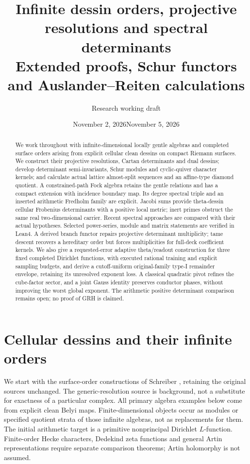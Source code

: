 \documentclass[11pt]{article}
\date{November 2, 2026}
\date{November 5, 2026}
\title{Infinite dessin orders, projective resolutions and spectral determinants\\\large Extended proofs, Schur functors and Auslander--Reiten calculations}
\author{Research working draft}
\theoremstyle{definition}\newtheorem{definition}[theorem]{Definition}
\theoremstyle{remark}\newtheorem{remark}[theorem]{Remark}
\begin{document}
\maketitle
\begin{abstract}
We work throughout with infinite-dimensional locally gentle algebras and completed surface orders arising from explicit cellular clean dessins on compact Riemann surfaces. We construct their projective resolutions, Cartan determinants and dual dessins; develop determinant semi-invariants, Schur modules and cyclic-quiver character kernels; and calculate actual lattice almost-split sequences and an affine-type diamond quotient. A constrained-path Fock algebra retains the gentle relations and has a compact extension with incidence boundary map. Its degree spectral triple and an inserted arithmetic Fredholm family are explicit. Jacobi sums provide theta-dessin cellular Frobenius determinants with a positive local metric; inert primes obstruct the same real two-dimensional carrier. Recent spectral approaches are compared with their actual hypotheses. Selected power-series, module and matrix statements are verified in Lean4. A derived branch functor repairs projective determinant multiplicity; tame descent recovers a hereditary order but forces multiplicities for full-deck coefficient kernels. We also give a requested-error adaptive theta/readout construction for three fixed completed Dirichlet functions, with executed rational training and explicit sampling budgets, and derive a cutoff-uniform original-family type-I remainder envelope, retaining its unresolved exponent loss. A classical quadratic pivot refines the cube-factor sector, and a joint Gauss identity preserves conductor phases, without improving the worst global exponent. The arithmetic positive determinant comparison remains open; no proof of GRH is claimed.
\end{abstract}
{\small\tableofcontents}
\section{Cellular dessins and their infinite orders}
We start with the surface-order constructions of Schreiber \cite{SurfaceOrders,SurfaceDuality}, retaining the original sources unchanged. The generic-resolution source \cite{Persistence} is background, not a substitute for exactness of a particular complex. All primary algebra examples below come from explicit clean Belyi maps. Finite-dimensional objects occur as modules or specified quotient strata of those infinite algebras, not as replacements for them. The initial arithmetic target is a primitive nonprincipal Dirichlet $L$-function. Finite-order Hecke characters, Dedekind zeta functions and general Artin representations require separate comparison theorems; Artin holomorphy is not assumed.
\end{document}
